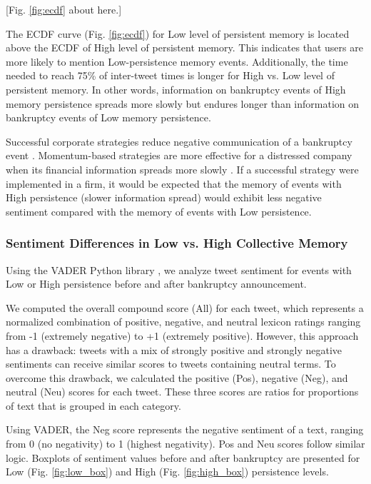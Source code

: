 \documentclass[9pt,twocolumn,twoside,lineno]{pnas-new}
\begin{document}
\centerline{[Fig. \ref{fig:ecdf} about here.]}


The ECDF curve (Fig. \ref{fig:ecdf}) for Low level of persistent memory is located above the  ECDF of High level of persistent memory.
This indicates that users are more likely to mention Low-persistence memory events.
Additionally, the time needed to reach 75\% of inter-tweet times is longer for High vs. Low level of persistent memory.
In other words, information on bankruptcy events of High memory persistence spreads more slowly but endures longer than information on bankruptcy events of Low memory persistence.

Successful corporate strategies reduce negative communication of a bankruptcy event \cite{setiowati2022public}.
Momentum-based strategies are more effective for a distressed company when its financial information spreads more slowly \cite{hong2000bad, doukas2005european}.
If a successful strategy were implemented in a firm, it would be expected that the memory of events with High persistence (slower information spread) would exhibit less negative sentiment compared with the memory of events with Low persistence.

\subsubsection*{Sentiment Differences in Low vs. High Collective Memory}
Using the VADER Python library \cite{hutto2014vader}, we analyze tweet sentiment for events with Low or High persistence before and after bankruptcy announcement.

We computed the overall compound score (All) for each tweet, which represents a normalized combination of positive, negative, and neutral lexicon ratings ranging from -1 (extremely negative) to +1 (extremely positive).
However, this approach has a drawback: tweets with a mix of strongly positive and strongly negative sentiments can receive similar scores to tweets containing neutral terms.
To overcome this drawback, we calculated the positive (Pos), negative (Neg), and neutral (Neu) scores for each tweet.
These three scores are ratios for proportions of text that is grouped in each category.

Using VADER, the Neg score represents the negative sentiment of a text, ranging from 0 (no negativity) to 1 (highest negativity).
Pos and Neu scores follow similar logic.
Boxplots of sentiment values before and after bankruptcy are presented for Low (Fig. \ref{fig:low_box}) and High (Fig. \ref{fig:high_box}) persistence levels.
\end{document}
